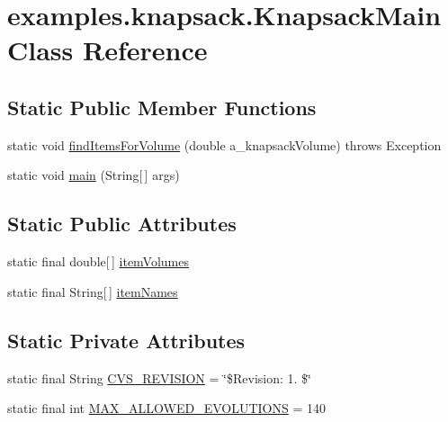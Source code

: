 \hypertarget{classexamples_1_1knapsack_1_1_knapsack_main}{\section{examples.\-knapsack.\-Knapsack\-Main Class Reference}
\label{classexamples_1_1knapsack_1_1_knapsack_main}
}
\subsection*{Static Public Member Functions}
\begin{DoxyCompactItemize}
\item 
static void \hyperlink{classexamples_1_1knapsack_1_1_knapsack_main_a21b0e58519b7fc734c2782b2218ecbda}{find\-Items\-For\-Volume} (double a\-\_\-knapsack\-Volume)  throws Exception 
\item 
static void \hyperlink{classexamples_1_1knapsack_1_1_knapsack_main_a5f52e75b5dbf4cd975197166cba7d5b0}{main} (String\mbox{[}$\,$\mbox{]} args)
\end{DoxyCompactItemize}
\subsection*{Static Public Attributes}
\begin{DoxyCompactItemize}
\item 
static final double\mbox{[}$\,$\mbox{]} \hyperlink{classexamples_1_1knapsack_1_1_knapsack_main_a06ab99a0d126994951ab7338311b1893}{item\-Volumes}
\item 
static final String\mbox{[}$\,$\mbox{]} \hyperlink{classexamples_1_1knapsack_1_1_knapsack_main_ae9c0550852c5c346f14d9c22ab1f00c4}{item\-Names}
\end{DoxyCompactItemize}
\subsection*{Static Private Attributes}
\begin{DoxyCompactItemize}
\item 
static final String \hyperlink{classexamples_1_1knapsack_1_1_knapsack_main_ac34751b27a917d91386fb15f825b4c3c}{C\-V\-S\-\_\-\-R\-E\-V\-I\-S\-I\-O\-N} = \char`\"{}\$Revision\-: 1. \$\char`\"{}
\item 
static final int \hyperlink{classexamples_1_1knapsack_1_1_knapsack_main_a422a541b748d8950d8477962c996b587}{M\-A\-X\-\_\-\-A\-L\-L\-O\-W\-E\-D\-\_\-\-E\-V\-O\-L\-U\-T\-I\-O\-N\-S} = 140
\end{DoxyCompactItemize}


